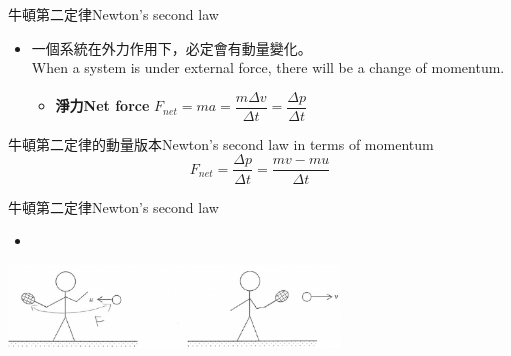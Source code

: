 \documentclass[13pt]{beamer}
\begin{document}
\begin{frame}{牛頓第二定律Newton's second law}
    \begin{itemize}
        \item 一個系統在外力作用下，必定會有動量變化。\\When a system is under external force, there will be a change of momentum.
              \begin{itemize}
                  \item [] \textbf{淨力Net force} $F_{net}=ma=\dfrac{m\Delta v}{\Delta t}=\dfrac{\Delta p}{\Delta t}$
              \end{itemize}
    \end{itemize}
    \begin{alertblock}
        {牛頓第二定律的動量版本Newton's second law in terms of momentum}
        \begin{equation}
            F_{net}=\frac{\Delta p}{\Delta t}=\frac{mv-mu}{\Delta t}
        \end{equation}
    \end{alertblock}
\end{frame}

\begin{frame}{牛頓第二定律Newton's second law}
    \begin{itemize}
        \item[] 
    \end{itemize}
    {\par\centering
    \includegraphics[width=0.66\textwidth]{assets/bc5b866b.png}
    \par}
\end{frame}
\end{document}
